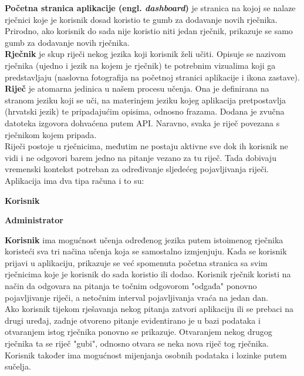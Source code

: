 		\textbf{Početna stranica aplikacije (engl. \textit{dashboard})} je stranica na kojoj se nalaze rječnici koje je korisnik dosad koristio te gumb za dodavanje novih rječnika. Prirodno, ako korisnik do sada nije koristio niti jedan rječnik, prikazuje se samo gumb za dodavanje novih rječnika.
		\\
		
		\textbf{Rječnik} je skup riječi nekog jezika koji korisnik želi učiti. Opisuje se nazivom rječnika (ujedno i jezik na kojem je rječnik) te potrebnim vizualima koji ga predstavljaju (naslovna fotografija na početnoj stranici aplikacije i ikona zastave).
		\\

		\textbf{Riječ} je atomarna jedinica u našem procesu učenja. Ona je definirana na stranom jeziku koji se uči, na materinjem jeziku kojeg aplikacija pretpostavlja (hrvatski jezik) te pripadajućim opisima, odnosno frazama. Dodana je zvučna datoteka izgovora dohvaćena putem API. Naravno, svaka je riječ povezana s rječnikom kojem pripada.
		\\

		\noindent Riječi postoje u rječnicima, međutim ne postaju aktivne sve dok ih korisnik ne vidi i ne odgovori barem jedno na pitanje vezano za tu riječ. Tada dobivaju vremenski kontekst potreban za određivanje sljedećeg pojavljivanja riječi.
		\newline
		\newline
		Aplikacija ima dva tipa računa i to su:
		\begin{packed_item}
			\item \textbf{Korisnik} 
			\item \textbf{Administrator}
		\end{packed_item}

		\textbf{Korisnik} ima mogućnost učenja određenog jezika putem istoimenog rječnika koristeći sva tri načina učenja koja se samostalno izmjenjuju. Kada se korisnik prijavi u aplikaciju, prikazuje se već spomenuta početna stranica sa svim rječnicima koje je korisnik do sada koristio ili dodao. Korisnik rječnik koristi na način da odgovara na pitanja te točnim odgovorom "odgađa" ponovno pojavljivanje riječi, a netočnim interval pojavljivanja vraća na jedan dan.
		\\

		\noindent Ako korisnik tijekom rješavanja nekog pitanja zatvori aplikaciju ili se prebaci na drugi uređaj, zadnje otvoreno pitanje evidentirano je u bazi podataka i otvaranjem istog rječnika ponovno se prikazuje. Otvaranjem nekog drugog rječnika ta se riječ "gubi", odnosno otvara se neka nova riječ tog rječnika. Korisnik također ima mogućnost mijenjanja osobnih podataka i lozinke putem sučelja.
		\\

